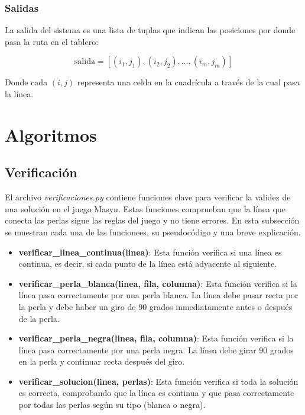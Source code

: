 \documentclass{article}
\begin{document}
\subsubsection{Salidas}

La salida del sistema es una lista de tuplas que indican las posiciones por donde pasa la ruta en el tablero:

\[
\text{salida} = [(i_1, j_1), (i_2, j_2), \ldots, (i_m, j_m)]
\]

Donde cada \((i, j)\) representa una celda en la cuadrícula a través de la cual pasa la línea.



\section{Algoritmos}

\subsection{Verificación}

El archivo \textit{verificaciones.py} contiene funciones clave para verificar la validez de una solución en el juego Masyu. Estas funciones comprueban que la línea que conecta las perlas sigue las reglas del juego y no tiene errores. En esta subsección se muestran cada una de las funcionees, su pseudocódigo y una breve explicación.

\begin{itemize}
    \item \textbf{verificar\_linea\_continua(linea)}: Esta función verifica si una línea es continua, es decir, si cada punto de la línea está adyacente al siguiente.
    \item \textbf{verificar\_perla\_blanca(linea, fila, columna)}: Esta función verifica si la línea pasa correctamente por una perla blanca. La línea debe pasar recta por la perla y debe haber un giro de 90 grados inmediatamente antes o después de la perla.
    
    \item \textbf{verificar\_perla\_negra(linea, fila, columna)}: Esta función verifica si la línea pasa correctamente por una perla negra. La línea debe girar 90 grados en la perla y continuar recta después del giro.
    
    \item\textbf{verificar\_solucion(linea, perlas)}: Esta función verifica si toda la solución es correcta, comprobando que la línea es continua y que pasa correctamente por todas las perlas según su tipo (blanca o negra).
\end{itemize}
\end{document}
